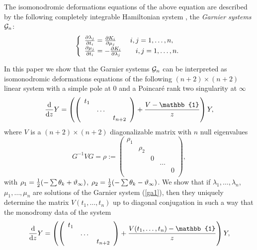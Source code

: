 \documentclass[12pt]{article}
\def\thi{{\vartheta_\infty}}
\newcommand{\ID}{\mathbb{1}}
\theoremstyle{definition}
\theoremstyle{theorem}
\begin{document}
The isomonodromic deformations equations of the above equation are 
described by the following completely integrable Hamiltonian system 
\cite{Gar1,Gar2,Ok1,IKSY}, the {\it Garnier systems}\/ ${\cal G}_n$:
\begin{equation}
\left\{\begin{array}{l}
{\partial\lambda_j\over\partial t_i}={\partial
K_i\over\partial\mu_j}
\qquad i,j=1,\dots,n,\\
{\partial\mu_j\over\partial t_i}=-{\partial K_i\over\partial\lambda_j}
\qquad i,j=1,\dots,n.\\
\end{array}
\right.
\label{ga1}\end{equation}
%

In this paper we show that the Garnier systems ${\cal G}_n$ can be 
interpreted as isomonodromic deformations equations of the
following $(n+2)\times(n+2)$ linear system with a simple pole at $0$ and a 
Poincar\'e rank two singularity at $\infty$
\begin{equation}
{{\rm d}\over{\rm d}z}Y
=\left(\left(\begin{array}{ccc}t_1& & \\ & \dots&\\ & & t_{n+2}
\end{array}\right)+{V-\ID\over z}\right) Y,
\label{irreg}\end{equation}
where $V$ is a $(n+2)\times(n+2)$ diagonalizable matrix with $n$
null eigenvalues 
\begin{equation}
G^{-1}VG = \rho:=\left(\begin{array}{ccccc}
\rho_1& & & &\\
&\rho_2& & &\\ & & 0 & &\\ & & & \dots & \\ & & & & 0\\
\end{array}\right),
\label{cV}\end{equation}
with $\rho_1={1\over 2}(-\sum\theta_k+\thi)$,
$\rho_2={1\over 2}(-\sum\theta_k-\thi)$. We show that
if $\lambda_1,\dots,\lambda_n$, $\mu_1,\dots,\mu_n$ are solutions of the 
Garnier system (\ref{ga1}), then they uniquely determine the matrix 
$V(t_1,\dots,t_n)$ up to diagonal conjugation in such a way that the 
monodromy data of the system 
$$
{{\rm d}\over{\rm d}z}Y
=\left(\left(\begin{array}{ccc}t_1& & \\ & \dots&\\ & & t_{n+2}
\end{array}\right)+{V(t_1,\dots,t_n)-\ID\over z}\right) Y,
$$ 
\end{document}
